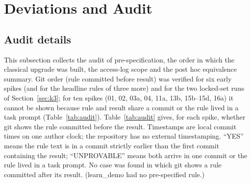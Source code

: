 \small

\section{Deviations and Audit}
\label{app:audit}

\subsection{Audit details}
This subsection collects the audit of pre-specification, the order in which the classical upgrade was built, the access-log scope and the post hoc equivalence summary. Git order (rule committed before result) was verified for six early spikes (and for the headline rules of three more) and for the two locked-set runs of Section~\ref{sec:k3}; for ten spikes (01, 02, 03a, 04, 11a, 13b, 15b--15d, 16a) it cannot be shown because rule and result share a commit or the rule lived in a task prompt (Table~\ref{tab:audit}). Table~\ref{tab:audit} gives, for each spike, whether git shows the rule committed before the result. Timestamps are local commit times on one author clock; the repository has no external timestamping. ``YES'' means the rule text is in a commit strictly earlier than the first commit containing the result; ``UNPROVABLE'' means both arrive in one commit or the rule lived in a task prompt. No case was found in which git shows a rule committed after its result. (learn\_demo had no pre-specified rule.)

